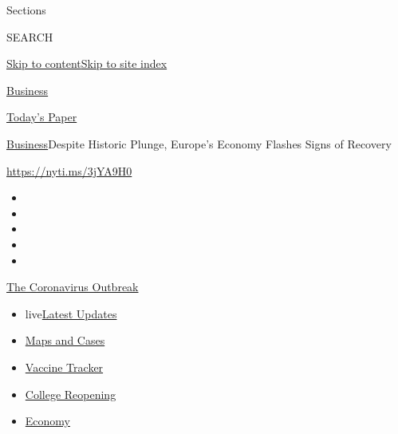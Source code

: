 Sections

SEARCH

\protect\hyperlink{site-content}{Skip to
content}\protect\hyperlink{site-index}{Skip to site index}

\href{https://www.nytimes3xbfgragh.onion/section/business}{Business}

\href{https://myaccount.nytimes3xbfgragh.onion/auth/login?response_type=cookie\&client_id=vi}{}

\href{https://www.nytimes3xbfgragh.onion/section/todayspaper}{Today's
Paper}

\href{/section/business}{Business}\textbar{}Despite Historic Plunge,
Europe's Economy Flashes Signs of Recovery

\href{https://nyti.ms/3jYA9H0}{https://nyti.ms/3jYA9H0}

\begin{itemize}
\item
\item
\item
\item
\item
\end{itemize}

\href{https://www.nytimes3xbfgragh.onion/news-event/coronavirus?action=click\&pgtype=Article\&state=default\&region=TOP_BANNER\&context=storylines_menu}{The
Coronavirus Outbreak}

\begin{itemize}
\tightlist
\item
  live\href{https://www.nytimes3xbfgragh.onion/2020/08/03/world/coronavirus-covid-19.html?action=click\&pgtype=Article\&state=default\&region=TOP_BANNER\&context=storylines_menu}{Latest
  Updates}
\item
  \href{https://www.nytimes3xbfgragh.onion/interactive/2020/us/coronavirus-us-cases.html?action=click\&pgtype=Article\&state=default\&region=TOP_BANNER\&context=storylines_menu}{Maps
  and Cases}
\item
  \href{https://www.nytimes3xbfgragh.onion/interactive/2020/science/coronavirus-vaccine-tracker.html?action=click\&pgtype=Article\&state=default\&region=TOP_BANNER\&context=storylines_menu}{Vaccine
  Tracker}
\item
  \href{https://www.nytimes3xbfgragh.onion/2020/08/02/us/covid-college-reopening.html?action=click\&pgtype=Article\&state=default\&region=TOP_BANNER\&context=storylines_menu}{College
  Reopening}
\item
  \href{https://www.nytimes3xbfgragh.onion/live/2020/08/03/business/stock-market-today-coronavirus?action=click\&pgtype=Article\&state=default\&region=TOP_BANNER\&context=storylines_menu}{Economy}
\end{itemize}

